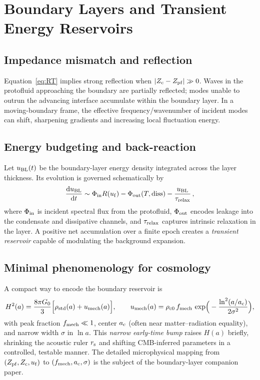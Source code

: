 \documentclass[11pt,a4paper]{article}
\newcommand{\dx}{\mathrm{d}}
\newcommand{\ac}{a_{\rm c}}
\newcommand{\rs}{r_{\rm s}}
\begin{document}
\section{Boundary Layers and Transient Energy Reservoirs}
\label{sec:boundary}
\subsection{Impedance mismatch and reflection}
Equation~\eqref{eq:RT} implies strong reflection when $|Z_{\rm c}-Z_{\rm pf}|\gg 0$. Waves in the protofluid approaching the boundary are partially reflected; modes unable to outrun the advancing interface accumulate within the boundary layer. In a moving-boundary frame, the effective frequency/wavenumber of incident modes can shift, sharpening gradients and increasing local fluctuation energy.

\subsection{Energy budgeting and back-reaction}
Let $u_{\rm BL}(t)$ be the boundary-layer energy density integrated across the layer thickness. Its evolution is governed schematically by
\begin{equation}
\frac{\dx u_{\rm BL}}{\dx t} \sim \Phi_{\rm in} R(u_{\rm f}) - \Phi_{\rm out}(T,\text{diss}) - \frac{u_{\rm BL}}{\tau_{\rm relax}}\,,
\end{equation}
where $\Phi_{\rm in}$ is incident spectral flux from the protofluid, $\Phi_{\rm out}$ encodes leakage into the condensate and dissipative channels, and $\tau_{\rm relax}$ captures intrinsic relaxation in the layer. A positive net accumulation over a finite epoch creates a \emph{transient reservoir} capable of modulating the background expansion.

\subsection{Minimal phenomenology for cosmology}
A compact way to encode the boundary reservoir is
\begin{equation}
H^2(a) = \frac{8\pi G_0}{3}\Big[\rho_{\rm std}(a) + u_{\rm mech}(a)\Big], \qquad
u_{\rm mech}(a)= \rho_{\rm c0}\, f_{\rm mech}\,
\exp\!\Big(-\frac{\ln^2(a/\ac)}{2\sigma^2}\Big),
\end{equation}
with peak fraction $f_{\rm mech}\ll 1$, center $\ac$ (often near matter--radiation equality), and narrow width $\sigma$ in $\ln a$. This \emph{narrow early-time bump} raises $H(a)$ briefly, shrinking the acoustic ruler $\rs$ and shifting CMB-inferred parameters in a controlled, testable manner. The detailed microphysical mapping from $(Z_{\rm pf},Z_{\rm c},u_{\rm f})$ to $(f_{\rm mech},\ac,\sigma)$ is the subject of the boundary-layer companion paper.
\end{document}
